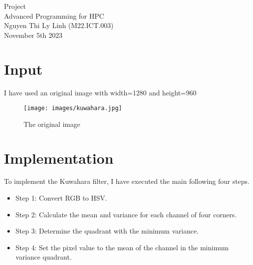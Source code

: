 \documentclass[12pt]{article}
\begin{document}
\begin{center}
    \vspace*{1.8cm}
    \Large
    Project\\
    Advanced Programming for HPC\\
    Nguyen Thi Ly Linh (M22.ICT.003)\\
    November 5th 2023\\
\end{center}

\section{Input}
I have used an original image with width=1280 and height=960
\begin{figure}[H]
\centering
    \texttt{[image: images/kuwahara.jpg]}
    \caption{The original image}
\end{figure}
\section{Implementation}
To implement the Kuwahara filter, I have executed the main following four steps.
\begin{itemize}
    \item Step 1: Convert RGB to HSV.
    \item Step 2: Calculate the mean and variance for each channel of four corners.
    \item Step 3: Determine the quadrant with the minimum variance.
    \item Step 4: Set the pixel value to the mean of the channel in the minimum variance quadrant.
\end{itemize}
\end{document}
